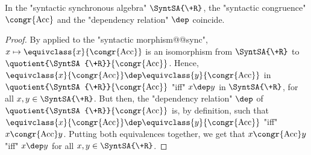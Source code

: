 \begin{corollary}
	\AP\label{coro:syntactic-congruence-is-syntactic-dependency}
	In the "syntactic synchronous algebra" $\SyntSA{\+R}$, the "syntactic
	congruence" $\congr{\Acc}$ and the "dependency relation" $\dep$
	coincide. 
\end{corollary}

\begin{proof}
	By 
	applied to the "syntactic morphism@@sync",
	$x \mapsto \equivclass{x}{\congr{\Acc}}$
	is an isomorphism from $\SyntSA{\+R}$ to $\quotient{\SyntSA{\+R}}{\congr{\Acc}}$.
	Hence, $\equivclass{x}{\congr{\Acc}} \dep \equivclass{y}{\congr{\Acc}}$
	in $\quotient{\SyntSA{\+R}}{\congr{\Acc}}$
	"iff" $x \dep y$ in $\SyntSA{\+R}$, for all $x,y \in \SyntSA{\+R}$.
	But then, the "dependency relation" $\dep$ of
	$\quotient{\SyntSA{\+R}}{\congr{\Acc}}$ is, by definition,
	such that $\equivclass{x}{\congr{\Acc}} \dep \equivclass{y}{\congr{\Acc}}$
	"iff" $x \congr{\Acc} y$.
	Putting both equivalences together, we get that
	$x \congr{\Acc} y$ "iff" $x \dep y$ for all $x,y \in \SyntSA{\+R}$.
\end{proof}

